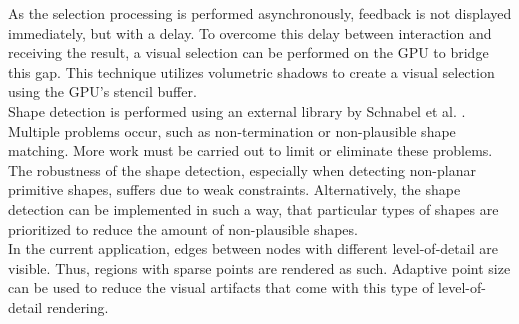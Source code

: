 As the selection processing is performed asynchronously, feedback is not displayed immediately, but with a delay. To overcome this delay between interaction and receiving the result, a visual selection can be performed on the GPU \cite{rainer2016visual} to bridge this gap. This technique utilizes volumetric shadows to create a visual selection using the GPU's stencil buffer. 
\\

Shape detection is performed using an external library by Schnabel et al. \cite{schnabel-2007-software}. Multiple problems occur, such as non-termination or non-plausible shape matching. More work must be carried out to limit or eliminate these problems. The robustness of the shape detection, especially when detecting non-planar primitive shapes, suffers due to weak constraints. Alternatively, the shape detection can be implemented in such a way, that particular types of shapes are prioritized to reduce the amount of non-plausible shapes. 
\\

In the current application, edges between nodes with different level-of-detail are visible. Thus, regions with sparse points are rendered as such. Adaptive point size can be used to reduce the visual artifacts that come with this type of level-of-detail rendering. 

